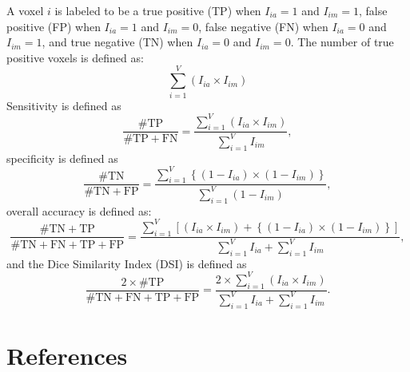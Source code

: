 \documentclass{elsarticle}\usepackage[]{graphicx}\usepackage[]{color}
\begin{document}
A voxel $i$ is labeled to be a true positive (TP) when $I_{ia} = 1$ and $I_{im} = 1$, false positive (FP) when $I_{ia} = 1$ and $I_{im} = 0$, false negative (FN) when $I_{ia} = 0$ and $I_{im} = 1$, and true negative (TN) when $I_{ia} = 0$ and $I_{im} = 0$.  The number of true positive voxels is defined as: 
$$
\sum_{i=1}^{V} \left( I_{ia} \times I_{im}\right)
$$
Sensitivity is defined as
$$
\frac{\# \text{TP} }{\# \text{TP} + \text{FN}} = \frac{ \sum_{i=1}^{V} \left( I_{ia} \times I_{im}\right) }{ \sum_{i=1}^{V} I_{im}},
$$
specificity is defined as
$$
\frac{\# \text{TN} }{\# \text{TN} + \text{FP}} = \frac{ \sum_{i=1}^{V} \left\{ (1-I_{ia}) \times (1- I_{im} ) \right\} }{ \sum_{i=1}^{V} (1 - I_{im} )},
$$
overall accuracy is defined as:
$$
\frac{\# \text{TN} + \text{TP} }{\# \text{TN} + \text{FN} + \text{TP} + \text{FP}} = \frac{ \sum_{i=1}^{V} \left[ (I_{ia} \times I_{im}) + \left\{ (1-I_{ia}) \times (1- I_{im} ) \right\} \right] }{\sum_{i=1}^{V} I_{ia}  + \sum_{i=1}^{V} I_{im}},
$$
and the Dice Similarity Index (DSI) is defined as
$$
\frac{2 \times \#\text{TP} }{ \# \text{TN} + \text{FN} + \text{TP} + \text{FP}} = \frac{ 2 \times \sum_{i=1}^{V} \left( I_{ia} \times I_{im}\right) }{\sum_{i=1}^{V} I_{ia}  + \sum_{i=1}^{V} I_{im}}.
$$


\newpage
\section*{References}


\end{document}
